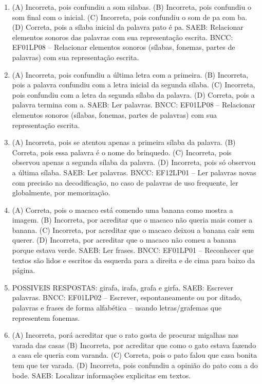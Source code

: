 \begin{enumerate}
\item
(A) Incorreta, pois confundiu a som silabas.
(B) Incorreta, pois confundiu o som final com o inicial.
(C) Incorreta, pois confundiu o som de pa com ba.
(D) Correta, pois a sílaba inicial da palavra pato é pa.
SAEB: Relacionar elementos sonoros das palavras com sua
representação escrita.
BNCC: EF01LP08 -- Relacionar elementos sonoros (sílabas, fonemas,
partes de palavras) com sua representação escrita.

\item
(A) Incorreta, pois confundiu a última letra com a primeira.
(B) Incorreta, pois a palavra confundiu com a letra inicial da segunda
sílaba.
(C) Incorreta, pois confundiu com a letra da segunda sílaba da palavra.
(D) Correta, pois a palavra termina com a.
SAEB: Ler palavras.
BNCC: EF01LP08 -- Relacionar elementos sonoros (sílabas, fonemas,
partes de palavras) com sua representação escrita.

\item
(A) Incorreta, pois se atentou apenas a primeira sílaba da palavra.
(B) Correta, pois essa palavra é o nome do brinquedo.
(C) Incorreta, pois observou apenas a segunda sílaba da palavra.
(D) Incorreta, pois só observou a última sílaba.
SAEB: Ler palavras.
BNCC: EF12LP01 -- Ler palavras novas com precisão na
decodificação, no caso de palavras de uso frequente, ler globalmente,
por memorização.

\item
(A) Correta, pois o macaco está comendo uma banana como mostra a imagem.
(B) Incorreta, por acreditar que o macaco não queria mais comer a banana.
(C) Incorreta, por acreditar que o macaco deixou a banana cair sem querer.
(D) Incorreta, por acreditar que o macaco não comeu a banana porque estava verde.
SAEB: Ler frases.
BNCC: EF01LP01 -- Reconhecer que textos são lidos e escritos da esquerda para a
direita e de cima para baixo da página.

\item
POSSIVEIS RESPOSTAS:
girafa, irafa, grafa e girfa.
SAEB: Escrever palavras.
BNCC: EF01LP02 -- Escrever, espontaneamente ou por ditado,
palavras e frases de forma alfabética -- usando letras/grafemas que
representem fonemas.

\item
(A) Incorreta, porá acreditar que o rato gosta de procurar migalhas nas
varada das casas
(B) Incorreta, por acreditar que como o gato estava fazendo a casa ele
queria com varanda.
(C) Correta, pois o pato falou que casa bonita tem que ter varada.
(D) Incorreta, pois confundiu a opinião do pato com a do bode.
SAEB: Localizar informações explicitas em textos.


\end{enumerate}
